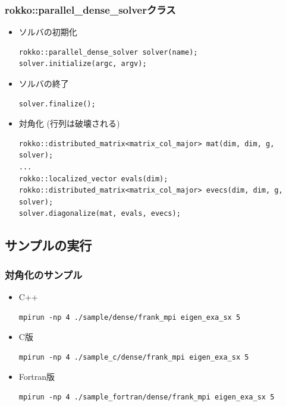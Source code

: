 \begin{frame}[c,fragile]
  \frametitle{rokko::parallel\_dense\_solverクラス}
  \begin{itemize}
  \item ソルバの初期化
\begin{lstlisting}
rokko::parallel_dense_solver solver(name);
solver.initialize(argc, argv);
\end{lstlisting}
  \item ソルバの終了
\begin{lstlisting}
solver.finalize();
\end{lstlisting}
  \item 対角化 (行列は破壊される)
\begin{lstlisting}
rokko::distributed_matrix<matrix_col_major> mat(dim, dim, g, solver);
...
rokko::localized_vector evals(dim);
rokko::distributed_matrix<matrix_col_major> evecs(dim, dim, g, solver);
solver.diagonalize(mat, evals, evecs);
\end{lstlisting}
  \end{itemize}
\end{frame}

\subsection{サンプルの実行}

\begin{frame}[c,fragile]
  \frametitle{対角化のサンプル}
  \begin{itemize}
  \item C++ 
\begin{lstlisting}[style=shstyle]
mpirun -np 4 ./sample/dense/frank_mpi eigen_exa_sx 5
\end{lstlisting}
  \item C版 
\begin{lstlisting}[style=shstyle]
mpirun -np 4 ./sample_c/dense/frank_mpi eigen_exa_sx 5
\end{lstlisting}
  \item Fortran版 
\begin{lstlisting}[style=shstyle]
mpirun -np 4 ./sample_fortran/dense/frank_mpi eigen_exa_sx 5
\end{lstlisting}

  \end{itemize}
\end{frame}

